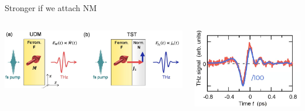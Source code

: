 \documentclass[aspectratio=1610, 9pt]{beamer}
\begin{document}
\begin{frame}{Stronger if we attach NM}
  \begin{columns}
    \begin{column}{0.6\textwidth}
    \includegraphics[width=\textwidth]{pics/FMNM.png}
    \nocite{arxiv}
    \end{column}
    \begin{column}{0.4\textwidth}
      \includegraphics[width=\textwidth]{pics/FM-vsdouble.png}
    \end{column}
  \end{columns}
\end{frame}
\end{document}
